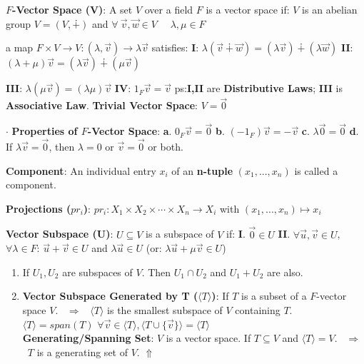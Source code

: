 \documentclass[9pt]{article}
\begin{document}
\textbf{$F$-Vector Space (V)}: A set $V$ over a field $F$ is a vector space if: \quad $V$ is an abelian group $V=(V,\dotplus)$ and $\forall \ \vec{v},\vec{w}\in V$ \ \ $\lambda,\mu\in F$

\quad \quad \quad \quad a map $F\times V\to V:(\lambda,\vec{v})\to\lambda\vec{v}$ satisfies: \textbf{I}: $\lambda(\vec{v}\dotplus\vec{w})=(\lambda\vec{v})\dotplus(\lambda\vec{w})$ \quad \textbf{II}: $(\lambda+\mu)\vec{v}=(\lambda\vec{v})\dotplus(\mu\vec{v})$

\quad \quad \quad \quad \textbf{III}: $\lambda(\mu\vec{v})=(\lambda\mu)\vec{v}$ \quad \textbf{IV}: $1_F\vec{v}=\vec{v}$ \hspace{30pt} {\scriptsize ps:\textbf{I,II} are \textbf{Distributive Laws}; \textbf{III} is \textbf{Associative Law}. \hspace{30pt} \textbf{Trivial Vector Space}: $V=\vec{0}$}

$\cdot$ \textbf{Properties of $F$-Vector Space}: \textbf{a}. $0_F\vec{v}=\vec{0}$ \quad \textbf{b}. $(-1_F)\vec{v}=-\vec{v}$ \quad \textbf{c}. $\lambda\vec{0}=\vec{0}$ \quad \textbf{d}. If $\lambda\vec{v}=\vec{0}$, then $\lambda=0$ or $\vec{v}=\vec{0}$ or both.

\textbf{Component}: An individual entry $x_i$ of an \textbf{n-tuple} $(x_1,...,x_n)$ is called a component.

\textbf{Projections ($pr_i$)}: $pr_i:X_1\times X_2\times\cdots\times X_n \to X_i$ with $(x_1,...,x_n)\mapsto x_i$

\textbf{Vector Subspace (U)}: $U\subseteq V$ is a subspace of $V$ if: \quad \textbf{I}. $\vec{0}\in U$ \quad \textbf{II}. $\forall \vec{u},\vec{v}\in U$, $\forall \lambda\in F$: $\vec{u}+\vec{v}\in U$ and $\lambda\vec{u}\in U$ \quad (or: $\lambda\vec{u}+\mu\vec{v}\in U$)

\begin{enumerate}[itemsep=-2pt, topsep=-2pt]
    \item If $U_1,U_2$ are subspaces of $V$. Then $U_1\cap U_2$ and $U_1+U_2$ are also. 
    \item \textbf{Vector Subspace Generated by T ($\langle T \rangle$)}: {\small If $T$ is a subset of a $F$-vector space $V$. \ $\Rightarrow$ \ $\langle T \rangle$ is the smallest subspace of $V$ containing $T$.}
    \quad $\langle T \rangle=span(T)$ \quad \quad $\forall \vec{v}\in\langle T \rangle,\langle T \cup\{\vec{v}\}\rangle=\langle T \rangle$ \quad {} \quad \quad \quad {} \\
    \quad \textbf{Generating/Spanning Set}: $V$ is a vector space. If $T\subseteq V$ and $\langle T \rangle=V$. \ $\Rightarrow$ \ $T$ is a generating set of $V$. $\Uparrow$
\end{enumerate}
\end{document}
